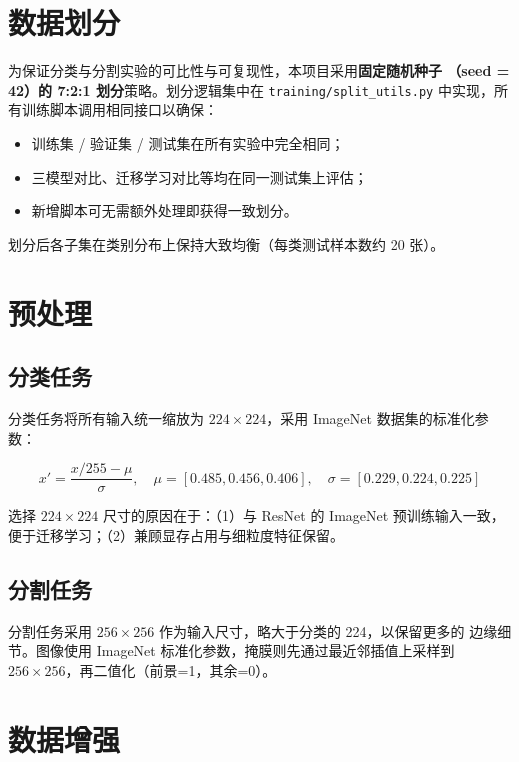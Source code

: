 \documentclass[12pt, a4paper, openany]{ctexbook}
\begin{document}
\section{数据划分}

为保证分类与分割实验的可比性与可复现性，本项目采用\textbf{固定随机种子
（seed = 42）的 7:2:1 划分}策略。划分逻辑集中在 \texttt{training/split\_utils.py}
中实现，所有训练脚本调用相同接口以确保：

\begin{itemize}[leftmargin=*]
  \item 训练集 / 验证集 / 测试集在所有实验中完全相同；
  \item 三模型对比、迁移学习对比等均在同一测试集上评估；
  \item 新增脚本可无需额外处理即获得一致划分。
\end{itemize}

划分后各子集在类别分布上保持大致均衡（每类测试样本数约 20 张）。

\section{预处理}

\subsection{分类任务}

分类任务将所有输入统一缩放为 $224 \times 224$，采用 ImageNet 数据集的标准化参数：

\begin{equation}
  x' = \frac{x / 255 - \mu}{\sigma},\quad
  \mu = [0.485, 0.456, 0.406],\quad
  \sigma = [0.229, 0.224, 0.225]
\end{equation}

选择 $224 \times 224$ 尺寸的原因在于：（1）与 ResNet 的 ImageNet 预训练输入一致，
便于迁移学习；（2）兼顾显存占用与细粒度特征保留。

\subsection{分割任务}

分割任务采用 $256 \times 256$ 作为输入尺寸，略大于分类的 224，以保留更多的
边缘细节。图像使用 ImageNet 标准化参数，掩膜则先通过最近邻插值上采样到
$256 \times 256$，再二值化（前景=1，其余=0）。

\section{数据增强}
\end{document}
